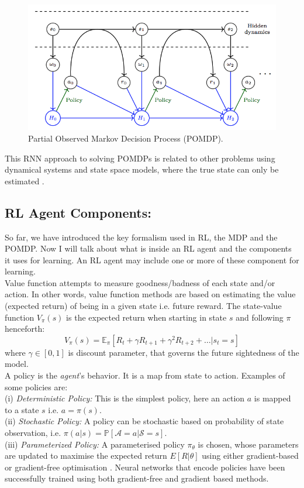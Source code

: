 \begin{figure}[t]
	\includegraphics[width=0.9\linewidth ]{fig/pomdp.png}
    \vspace{-2mm}
    \caption{Partial Observed Markov Decision Process (POMDP).}
    \label{fig:pomdp}
\end{figure}

This RNN approach to solving
POMDPs is related to other problems using dynamical systems
and state space models, where the true state can only be
estimated \cite{bertsekas2005dynamic}.


\subsection{RL Agent Components:}
So far, we have introduced the key formalism used in RL,
the MDP and the POMDP. Now I will talk about what is inside an RL agent and the components it uses for learning. An RL agent may include one or more of these component for learning.\\
Value function attempts to measure goodness/badness of each state and/or action.
In other words, value function methods are based on estimating the value
(expected return) of being in a given state i.e. future reward.
The state-value
function $V_{\pi}(s)$
 is the expected return when starting in state $s$
and following $\pi$ henceforth:
$$V_{\pi}(s) = \mathbb{E}_\pi [R_t +\gamma R_{t+1} + \gamma^2 R_{t+2}+\ldots  | s_t =s ]$$
where $\gamma \in [0,1]$ is discount parameter, that governs the future sightedness of the model.
\\
  A policy is the {\em agent}'s behavior. It is a map from state to action. Examples of some policies are: \\
(i) {\em Deterministic Policy:} This is the simplest policy, here an action $a$ is mapped to a state $s$ i.e. $a = \pi(s)$.\\
(ii) {\em Stochastic Policy:} A policy can be stochastic based on probability of state observation, i.e. $\pi(a|s) = \mathbb{P}[\mathcal{A}=a |  \mathcal{S} = s]$.\\
(iii) {\em Parameterized Policy:} A parameterised policy $\pi_\theta$ is chosen, whose
parameters are updated to maximise the expected return $E[R|\theta]$ using either gradient-based or gradient-free optimisation \cite{deisenroth2013survey}. Neural networks that encode policies have been successfully
trained using both gradient-free \cite{gomez2005evolving, cuccu2011intrinsically, koutnik2013evolving} and gradient based \cite{williams1992simple, lillicrap2015continuous, heess2015learning} methods.

